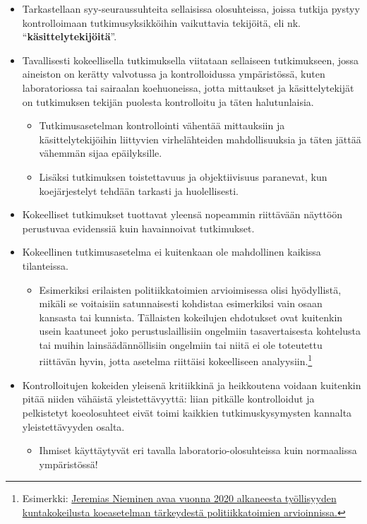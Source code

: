 \documentclass[
]{book}
\providecommand{\tightlist}{%
  \setlength{\itemsep}{0pt}\setlength{\parskip}{0pt}}
\begin{document}
\begin{itemize}
  \begin{itemize}
  \tightlist
  \item
    Tarkastellaan syy-seuraussuhteita sellaisissa olosuhteissa, joissa tutkija pystyy kontrolloimaan tutkimusyksikköihin vaikuttavia tekijöitä, eli nk. ``\textbf{käsittelytekijöitä}''.
  \item
    Tavallisesti kokeellisella tutkimuksella viitataan sellaiseen tutkimukseen, jossa aineiston on kerätty valvotussa ja kontrolloidussa ympäristössä, kuten laboratoriossa tai sairaalan koehuoneissa, jotta mittaukset ja käsittelytekijät on tutkimuksen tekijän puolesta kontrolloitu ja täten halutunlaisia.

    \begin{itemize}
    \tightlist
    \item
      Tutkimusasetelman kontrollointi vähentää mittauksiin ja käsittelytekijöihin liittyvien virhelähteiden mahdollisuuksia ja täten jättää vähemmän sijaa epäilyksille.
    \item
      Lisäksi tutkimuksen toistettavuus ja objektiivisuus paranevat, kun koejärjestelyt tehdään tarkasti ja huolellisesti.
    \end{itemize}
  \item
    Kokeelliset tutkimukset tuottavat yleensä nopeammin riittävään näyttöön perustuvaa evidenssiä kuin havainnoivat tutkimukset.
  \item
    Kokeellinen tutkimusasetelma ei kuitenkaan ole mahdollinen kaikissa tilanteissa.

    \begin{itemize}
    \tightlist
    \item
      Esimerkiksi erilaisten politiikkatoimien arvioimisessa olisi hyödyllistä, mikäli se voitaisiin satunnaisesti kohdistaa esimerkiksi vain osaan kansasta tai kunnista. Tällaisten kokeilujen ehdotukset ovat kuitenkin usein kaatuneet joko perustuslaillisiin ongelmiin tasavertaisesta kohtelusta tai muihin lainsäädännöllisiin ongelmiin tai niitä ei ole toteutettu riittävän hyvin, jotta asetelma riittäisi kokeelliseen analyysiin.\footnote{Esimerkki: \href{https://labore.fi/julkaisu/kuntakokeilut-kolmas-kerta-samat-ongelmat/}{Jeremias Nieminen avaa vuonna 2020 alkaneesta työllisyyden kuntakokeilusta koeasetelman tärkeydestä politiikkatoimien arvioinnissa.}}
    \end{itemize}
  \item
    Kontrolloitujen kokeiden yleisenä kritiikkinä ja heikkoutena voidaan kuitenkin pitää niiden vähäistä yleistettävyyttä: liian pitkälle kontrolloidut ja pelkistetyt koeolosuhteet eivät toimi kaikkien tutkimuskysymysten kannalta yleistettävyyden osalta.

    \begin{itemize}
    \tightlist
    \item
      Ihmiset käyttäytyvät eri tavalla laboratorio-olosuhteissa kuin normaalissa ympäristössä!
    \end{itemize}
  \end{itemize}
\end{itemize}
\end{document}
